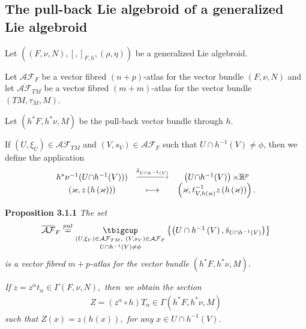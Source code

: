 \documentclass[11pt]{article}
\begin{document}
\subsection{The pull-back Lie algebroid of a generalized Lie algebroid}

Let $\left( \left( F,\nu ,N\right) ,\left[ ,\right] _{F,h},\left( \rho ,\eta
\right) \right) $ be a generalized Lie algebroid.

Let $\mathcal{AF}_{F}$ be a vector fibred $\left( n+p\right) $-atlas for the
vector bundle $\left( F,\nu ,N\right) $ and let $\mathcal{AF}_{TM}$ be a
vector fibred $\left( m+m\right) $-atlas for the vector bundle $\left(
TM,\tau _{M},M\right) $.

Let $\left( h^{\ast }F,h^{\ast }\nu ,M\right) $ be the pull-back vector
bundle through $h.$

If $\left( U,\xi _{U}\right) \in \mathcal{AF}_{TM}$ and $\left(
V,s_{V}\right) \in \mathcal{AF}_{F}$ such that $U\cap h^{-1}\left( V\right)
\neq \phi $, then we define the application%
\begin{equation*}
\begin{array}{ccc}
h^{\ast }\nu ^{-1}(U{\cap }h^{-1}(V))) & {}^{\underrightarrow{\bar{s}_{U{%
\cap }h^{-1}(V)}}} & \left( U{\cap }h^{-1}(V)\right) {\times }\mathbb{R}^{p}
\\
\left( \varkappa ,z\left( h\left( \varkappa \right) \right) \right) &
\longmapsto & \left( \varkappa ,t_{V,h\left( \varkappa \right) }^{-1}z\left(
h\left( \varkappa \right) \right) \right).%
\end{array}%
\end{equation*}

\textbf{Proposition 3.1.1 }\emph{The set}%
\begin{equation*}
\begin{array}{c}
\overline{\mathcal{AF}}_{F}\overset{put}{=}\underset{U\cap h^{-1}\left(
V\right) \neq \phi }{\underset{\left( U,\xi _{U}\right) \in \mathcal{AF}%
_{TM},~\left( V,s_{V}\right) \in \mathcal{AF}_{F}}{\tbigcup }}\left\{ \left(
U\cap h^{-1}\left( V\right) ,\bar{s}_{U{\cap }h^{-1}(V)}\right) \right\}%
\end{array}%
\end{equation*}%
\emph{is a vector fibred }$m+p$\emph{-atlas for the vector bundle }$\left(
h^{\ast }F,h^{\ast }\nu ,M\right) .$

\emph{If }$z=z^{\alpha }t_{\alpha }\in \Gamma \left( F,\nu ,N\right) ,$
\emph{then\ we obtain the section }%
\begin{equation*}
\begin{array}{c}
Z=\left( z^{\alpha }\circ h\right) T_{\alpha }\in \Gamma \left( h^{\ast
}F,h^{\ast }\nu ,M\right)
\end{array}%
\end{equation*}%
\emph{such that }$Z\left( x\right) =z\left( h\left( x\right) \right) ,$
\emph{for any }$x\in U\cap h^{-1}\left( V\right) .$\bigskip
\end{document}

